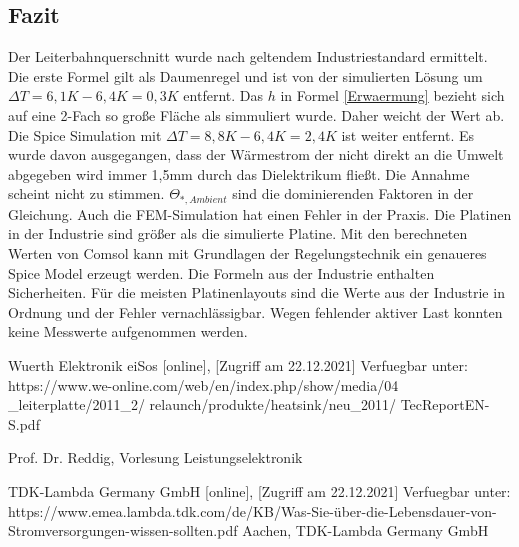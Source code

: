 \documentclass[10pt,a4paper,oneside,abstracton]{scrartcl}
\begin{document}
\begin{multicols}{2}
\section{Fazit}
Der Leiterbahnquerschnitt wurde nach geltendem Industriestandard ermittelt. 
\newline
Die erste Formel gilt als Daumenregel und ist von der simulierten Lösung um $\Delta T = 6,1K - 6,4K = 0,3K$ entfernt. \newline
Das $h $ in Formel \ref*{Erwaermung} bezieht sich auf eine 2-Fach so große Fläche als simmuliert wurde. Daher weicht der Wert ab. \newline
Die Spice Simulation mit $\Delta T = 8,8K - 6,4K = 2,4 K$ ist weiter entfernt.  \newline
Es wurde davon ausgegangen, dass der Wärmestrom der nicht direkt an die Umwelt abgegeben wird
immer 1,5mm durch das Dielektrikum fließt. Die Annahme scheint nicht zu stimmen. \newline
$ \Theta_{*, Ambient} $ sind die dominierenden Faktoren in der Gleichung.  \newline
Auch die FEM-Simulation hat einen Fehler in der Praxis. 
Die Platinen in der Industrie sind größer als die simulierte Platine.
Mit den berechneten Werten von Comsol kann mit Grundlagen der Regelungstechnik ein genaueres Spice Model erzeugt werden.  \newline
Die Formeln aus der Industrie enthalten Sicherheiten.
\newline
Für die meisten Platinenlayouts sind die Werte aus der Industrie in Ordnung und der Fehler vernachlässigbar. 
\newline
Wegen fehlender aktiver Last konnten keine Messwerte aufgenommen werden.
\noindent
\begin{thebibliography}{9}

Wuerth Elektronik eiSos  [online], [Zugriff am 22.12.2021] Verfuegbar unter:
 https://www.we-online.com/web/en/index.php/show/media/04
 \_leiterplatte/2011\_2/ relaunch/produkte/heatsink/neu\_2011/
 TecReport\-EN-S.pdf

Prof. Dr. Reddig, Vorlesung Leistungselektronik

TDK-Lambda Germany GmbH [online], [Zugriff am 22.12.2021] Verfuegbar unter:	https://www.emea.lambda.tdk.com/de/KB/Was-Sie-über-die-Lebensdauer-von-Stromversorgungen-wissen-sollten.pdf
Aachen, TDK-Lambda Germany GmbH




\end{thebibliography}
\end{multicols}
\end{document}
